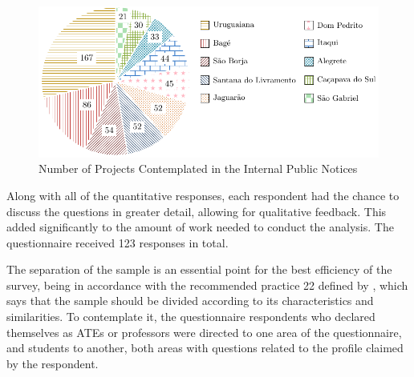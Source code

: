 \begin{figure}[htb]
  \caption{Number of Projects Contemplated in the Internal Public Notices}\label{fig:number-of-projects}
  \begin{center}
    \includegraphics[width=.9\textwidth]{img/5-number-of-projects.pdf}
  \end{center}
\end{figure}


Along with all of the quantitative responses, each respondent had the chance to discuss the questions in greater detail, allowing for qualitative feedback. This added significantly to the amount of work needed to conduct the analysis. The questionnaire received 123 responses in total.


The separation of the sample is an essential point for the best efficiency of the survey, being in accordance with the recommended practice 22 defined by \textcite{Jefferson}, which says that the sample should be divided according to its characteristics and similarities.
To contemplate it, the questionnaire respondents who declared themselves as \acp{ATE} or professors were directed to one area of the questionnaire, and students to another, both areas with questions related to the profile claimed by the respondent.
